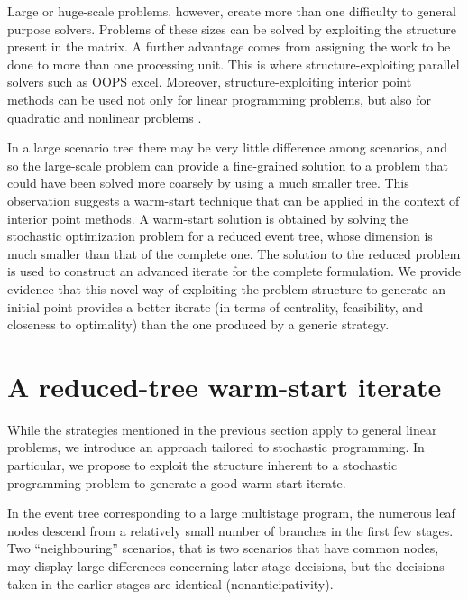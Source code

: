 \hrulefill

Large or huge-scale problems, however, create more than one difficulty 
to general purpose solvers. Problems of these sizes can be solved by 
exploiting the structure present in the matrix. A further advantage 
comes from assigning the work to be done to more than one processing unit. 
This is where structure-exploiting parallel solvers such as OOPS 
\cite{GondzioSarkissian} excel. Moreover, structure-exploiting interior 
point methods can be used not only for linear programming problems, 
but also for quadratic and nonlinear problems \cite{GondzioGrothey04}.

In a large scenario tree there may be very little difference among 
scenarios, and so the large-scale problem can provide a fine-grained 
solution to a problem that could have been solved more coarsely by 
using a much smaller tree. This observation suggests a
warm-start technique that can be applied in the context of interior 
point methods. A warm-start solution is obtained by solving the 
stochastic optimization problem for a reduced event tree, whose 
dimension is much smaller than that of the complete one. The solution 
to the reduced problem is used to construct an advanced iterate for 
the complete formulation. We provide evidence that this novel way 
of exploiting the problem structure to generate an initial point 
provides a better iterate (in terms of centrality, feasibility, 
and closeness to optimality) than the one produced by a generic 
strategy.


%
%
\section{A reduced-tree warm-start iterate}
\label{sec:ReducedTree}

While the strategies mentioned in the previous section apply to
general linear problems, we introduce an approach tailored to
stochastic programming. In particular, we propose to exploit the structure
inherent to a stochastic programming problem to generate a good 
warm-start iterate.

In the event tree corresponding to a large multistage program, 
the numerous leaf nodes descend from a relatively small number of 
branches in the first few stages. Two ``neighbouring'' scenarios, 
that is two scenarios that have common nodes, may display large 
differences concerning later stage decisions, but the decisions 
taken in the earlier stages are identical (nonanticipativity).

